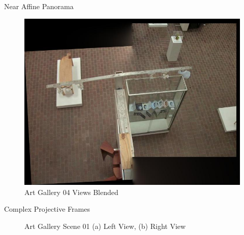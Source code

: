 \documentclass{beamer}
\begin{document}
\begin{frame}[c]{\sc Near Affine Panorama}

\begin{figure}[!h]
\centering
\includegraphics[width=.8\columnwidth]{AGS4SP005005}
\caption{Art Gallery 04 Views Blended}
\label{ArtGallery4Stitched}
\end{figure}

\end{frame}


\begin{frame}[c]{\sc Complex Projective Frames}

\begin{figure}[!h]
\centering
{}
\caption{Art Gallery Scene 01 (a) Left View, (b) Right View}
\label{ArtGallery1Images}
\end{figure}

\end{frame}
\end{document}

